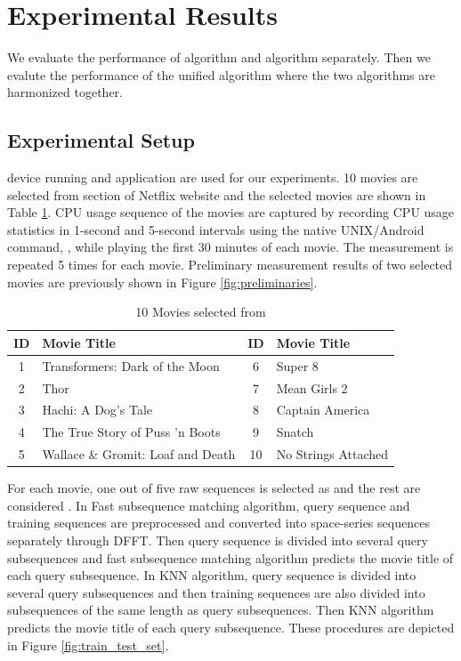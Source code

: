\section{Experimental Results}
\label{sec:experiments}

We evaluate the performance of  algorithm and  algorithm separately.
Then we evalute the performance of the unified algorithm where the two algorithms are harmonized together. 

\subsection{Experimental Setup}
 device running  and  application are used for our experiments. 
10 movies are selected from  section of Netflix website and the selected movies are shown in Table \ref{tab:movies}.
CPU usage sequence of the movies are captured by recording CPU usage statistics in 1-second and 5-second intervals using the native UNIX/Android command, , while playing the first 30 minutes of each movie. 
The measurement is repeated 5 times for each movie.
Preliminary measurement results of two selected movies are previously shown in Figure \ref{fig:preliminaries}.

\begin{table}[h!]
\begin{center}
\begin{tabular}{|c | m{5cm} ||c| m{5cm}|}
\hline
ID & Movie Title & ID & Movie Title \\ 
\hline
1 & Transformers: Dark of the Moon 		& 6 & Super 8\\
2 & Thor					& 7 & Mean Girls 2 \\
3 & Hachi: A Dog's Tale 			& 8 & Captain America \\
4 & The True Story of Puss 'n Boots 		& 9 &  Snatch \\
5 & Wallace \& Gromit: Loaf and Death 	& 10 & No Strings Attached \\
\hline
\end{tabular}
\end{center}
\caption{10 Movies selected from }
\label{tab:movies}
\end{table}

For each movie, one out of five raw sequences is selected as  and the rest are considered .
In Fast subsequence matching algorithm, query sequence and training sequences are preprocessed and converted into space-series sequences separately through DFFT.
Then query sequence is divided into several query subsequences and fast subsequence matching algorithm predicts the movie title of each query subsequence. 
In KNN algorithm, query sequence is divided into several query subsequences and then training sequences are also divided into subsequences of the same length as query subsequences. 
Then KNN algorithm predicts the movie title of each query subsequence. 
These procedures are depicted in Figure \ref{fig:train_test_set}.

